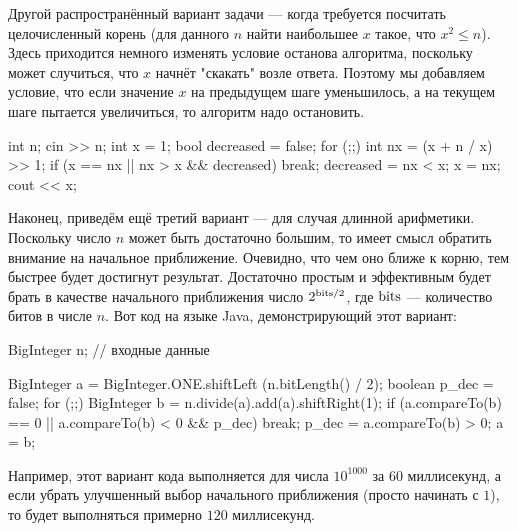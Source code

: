 Другой распространённый вариант задачи --- когда требуется посчитать целочисленный корень (для данного $n$ найти наибольшее $x$ такое, что $x^2 \le n$). Здесь приходится немного изменять условие останова алгоритма, поскольку может случиться, что $x$ начнёт "скакать" возле ответа. Поэтому мы добавляем условие, что если значение $x$ на предыдущем шаге уменьшилось, а на текущем шаге пытается увеличиться, то алгоритм надо остановить.

\code
int n;
cin >> n;
int x = 1;
bool decreased = false;
for (;;) {
	int nx = (x + n / x) >> 1;
	if (x == nx || nx > x && decreased)  break;
	decreased = nx < x;
	x = nx;
}
cout << x;
\endcode

Наконец, приведём ещё третий вариант --- для случая длинной арифметики. Поскольку число $n$ может быть достаточно большим, то имеет смысл обратить внимание на начальное приближение. Очевидно, что чем оно ближе к корню, тем быстрее будет достигнут результат. Достаточно простым и эффективным будет брать в качестве начального приближения число $2^{{\rm bits}/2}$, где $\rm bits$ --- количество битов в числе $n$. Вот код на языке Java, демонстрирующий этот вариант:

\code
BigInteger n; // входные данные

BigInteger a = BigInteger.ONE.shiftLeft (n.bitLength() / 2);
boolean p_dec = false;
for (;;) {
	BigInteger b = n.divide(a).add(a).shiftRight(1);
	if (a.compareTo(b) == 0 || a.compareTo(b) < 0 && p_dec)  break;
	p_dec = a.compareTo(b) > 0;
	a = b;
}
\endcode

Например, этот вариант кода выполняется для числа $10^{1000}$ за $60$ миллисекунд, а если убрать улучшенный выбор начального приближения (просто начинать с $1$), то будет выполняться примерно $120$ миллисекунд.
